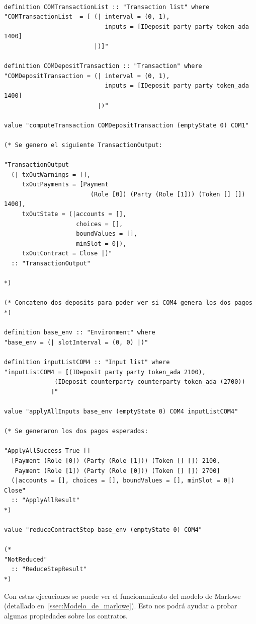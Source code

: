 \documentclass[12pt]{book}
\begin{document}
\begin{lstlisting}[style=Isabelle]

definition COMTransactionList :: "Transaction list" where
"COMTransactionList  = [ (| interval = (0, 1), 
                            inputs = [IDeposit party party token_ada 1400] 
                         |)]"

definition COMDepositTransaction :: "Transaction" where
"COMDepositTransaction = (| interval = (0, 1),
                            inputs = [IDeposit party party token_ada 1400]
                          |)"

value "computeTransaction COMDepositTransaction (emptyState 0) COM1"

(* Se genero el siguiente TransactionOutput:

"TransactionOutput
  (| txOutWarnings = [], 
     txOutPayments = [Payment 
                        (Role [0]) (Party (Role [1])) (Token [] []) 1400],
     txOutState = (|accounts = [], 
                    choices = [], 
                    boundValues = [], 
                    minSlot = 0|),
     txOutContract = Close |)"
  :: "TransactionOutput"

*)

(* Concateno dos deposits para poder ver si COM4 genera los dos pagos *)

definition base_env :: "Environment" where
"base_env = (| slotInterval = (0, 0) |)"

definition inputListCOM4 :: "Input list" where
"inputListCOM4 = [(IDeposit party party token_ada 2100),
              (IDeposit counterparty counterparty token_ada (2700))
             ]"

value "applyAllInputs base_env (emptyState 0) COM4 inputListCOM4"

(* Se generaron los dos pagos esperados:

"ApplyAllSuccess True []
  [Payment (Role [0]) (Party (Role [1])) (Token [] []) 2100,
   Payment (Role [1]) (Party (Role [0])) (Token [] []) 2700]
  (|accounts = [], choices = [], boundValues = [], minSlot = 0|) Close"
  :: "ApplyAllResult"
*)

value "reduceContractStep base_env (emptyState 0) COM4"

(*
"NotReduced"
  :: "ReduceStepResult"
*)
\end{lstlisting}

Con estas ejecuciones se puede ver el funcionamiento del modelo de Marlowe (detallado en~\ref{ssec:Modelo_de_marlowe}). Esto nos podrá ayudar a probar algunas propiedades sobre los contratos.
\end{document}
